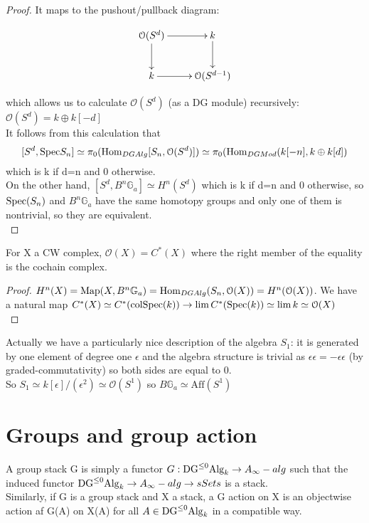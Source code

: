 \begin{refsection}
\begin{proof}
It maps to the pushout/pullback diagram:

\begin{displaymath}
\xymatrix{
\mathcal O(S^{d}) \ar[r] \ar[d] &  k \ar[d]\\
 k \ar[r] & \mathcal O(S^{d-1})\\
}
\end{displaymath}

which allows us to calculate $\mathcal O(S^d)$ (as a DG module) recursively: $\mathcal O(S^d)=k\oplus k[-d]$ \\
It follows from this calculation that
\[
[S^d,\mathrm{Spec} S_n]\simeq \pi_0(\mathrm{Hom}_{DGAlg}[S_n,\mathcal O(S^d)])\simeq \pi_0(\mathrm{Hom}_{DGMod}(k[-n],k\oplus k[d])
\]
which is k if d=n and 0 otherwise.\\
On the other hand, $[S^d,B^n\mathbb G_a]\simeq H^n(S^d)$ which is k if d=n and 0 otherwise, so $\mathrm{Spec}(S_n)$ and $B^n\mathbb G_a$ have the same homotopy groups 
and only one of them is nontrivial, so they are equivalent.\\

\end{proof}


\begin{thm}
For X a CW complex, $\mathcal O(X)=C^*(X)$ where the right member of the equality is the cochain complex.
\end{thm}

\begin{proof}
$H^n(X)=\operatorname{\mathrm{Map}}(X,B^n\mathbb G_a)=\mathrm{Hom}_{DGAlg}(S_n,\mathcal O(X))=H^n(\mathcal O(X))$. We have a natural map $C^*(X)\simeq C^*(\mathrm{col}\mathrm{Spec}(k))\to \lim C^*(\mathrm{Spec}(k))\simeq \lim k\simeq \mathcal O(X)$\\
\end{proof}
\begin{rmk}
Actually we have a particularly nice description of the algebra $S_1$: it is generated by one element of degree one $\epsilon$ and the algebra structure
is trivial as $\epsilon\epsilon=-\epsilon\epsilon$ (by graded-commutativity) so both sides are equal to 0.\\
So $S_1\simeq k[\epsilon]/(\epsilon^2)\simeq \mathcal O(S^1)$ so $B\mathbb G_a\simeq \mathrm{Aff}(S^1)$
\end{rmk}


\section{Groups and group action}

\begin{defin}
A group stack G is simply a functor $G:\mathrm{DG}^{\le 0}\mathrm{Alg}_k\to A_{\infty}-alg$ such that the induced functor $\mathrm{DG}^{\le 0}\mathrm{Alg}_k\to A_{\infty}-alg\to sSets$ is a stack.\\
Similarly, if G is a group stack and X a stack, a G action on X is an objectwise action af G(A) on X(A) for all $A\in\mathrm{DG}^{\le 0}\mathrm{Alg}_k$ in a compatible way.
\end{defin}


\end{refsection}

